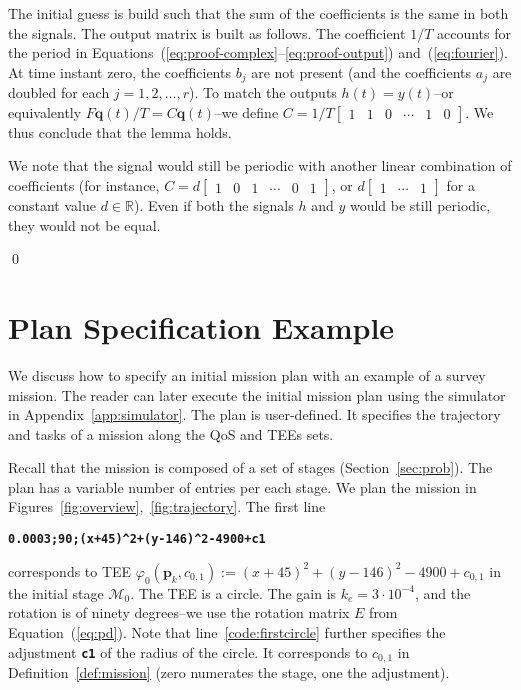\documentclass[letterpaper,10pt,conference]{ieeeconf}
\theoremstyle{definition}
\begin{document}
The initial guess is build such that the sum of the coefficients is the same in both the signals. The output matrix is built as follows. The coefficient $1/T$ accounts for the period in Equations~(\ref{eq:proof-complex}--\ref{eq:proof-output}) and~(\ref{eq:fourier}). At time instant zero, the coefficients $b_j$ are not present (and the coefficients $a_j$ are doubled for each $j=1,2,\dots,r$). To match the outputs $h(t)=y(t)$--or equivalently $F\mathbf{q}(t)/T=C\mathbf{q}(t)$--we define $C=1/T\begin{bmatrix}1 & 1 & 0 & \cdots & 1 & 0\end{bmatrix}$. We thus conclude that the lemma holds.

We note that the signal would still be periodic with another linear combination of coefficients (for instance, $C=d\begin{bmatrix}1 & 0 & 1 & \cdots & 0 & 1\end{bmatrix}$, or $d\begin{bmatrix}1 & \cdots & 1\end{bmatrix}$ for a constant value $d\in\mathbb{R}$). Even if both the signals $h$ and $y$ would be still periodic, they would not be equal.

\qed

\section{Plan Specification Example}
\label{app:plan-example}
We discuss how to specify an initial mission plan with an example of a survey mission. The reader can later execute the initial mission plan using the simulator in Appendix~\ref{app:simulator}. The plan is user-defined. It specifies the trajectory and tasks of a mission along the QoS and TEEs sets. 

Recall that the mission is composed of a set of stages (Section~\ref{sec:prob}). The plan has a variable number of entries per each stage. We plan the mission in Figures~\ref{fig:overview},~\ref{fig:trajectory}. The first line
\begin{algorithmic}[1]
  \State\textbf{\texttt{0.0003;90;(x+45)\^{}2+(y-146)\^{}2-4900+c1}}\label{code:firstcircle}
\end{algorithmic}
corresponds to TEE $\varphi_0(\mathbf{p}_k,c_{0,1}):=(x+45)^2+(y-146)^2-4900+c_{0,1}$ in the initial stage $\mathcal{M}_0$. The TEE is a circle. The gain is $k_e=3\cdot 10^{-4}$, and the rotation is of ninety degrees--we use the rotation matrix $E$ from Equation~(\ref{eq:pd}). Note that line~\ref{code:firstcircle} further specifies the adjustment {\tt\textbf{c1}} of the radius of the circle. It corresponds to $c_{0,1}$ in Definition~\ref{def:mission} (zero numerates the stage, one the adjustment).
\end{document}

